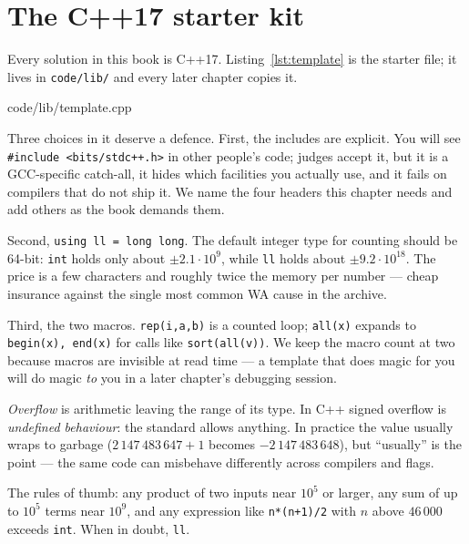 \section{The C++17 starter kit}\label{sec:starter}

Every solution in this book is C++17. Listing~\ref{lst:template} is the
starter file; it lives in \texttt{code/lib/} and every later chapter
copies it.


{code/lib/template.cpp}

Three choices in it deserve a defence. First, the includes are explicit.
You will see \texttt{\#include <bits/stdc++.h>} in other people's code; judges
accept it, but it is a GCC-specific catch-all, it hides which facilities you
actually use, and it fails on compilers that do not ship it. We name the four
headers this chapter needs and add others as the book demands them.

Second, \texttt{using ll = long long}. The default integer type for counting
should be 64-bit: \texttt{int} holds only
about $\pm 2.1\cdot 10^9$, while \texttt{ll} holds about
$\pm 9.2\cdot 10^{18}$. The price is a few characters and roughly twice the
memory per number --- cheap insurance against the single most common WA cause
in the archive.

Third, the two macros. \texttt{rep(i,a,b)} is a counted loop;
\texttt{all(x)} expands to \texttt{begin(x), end(x)} for calls like
\texttt{sort(all(v))}. We keep the macro count at two because macros are
invisible at read time --- a template that does magic for you will do magic
\emph{to} you in a later chapter's debugging session.

\begin{definition}
\emph{Overflow} is arithmetic leaving the range of its type. In C++ signed
overflow is \emph{undefined behaviour}: the standard
allows anything. In practice the value usually wraps to garbage
($2\,147\,483\,647+1$ becomes $-2\,147\,483\,648$), but ``usually'' is the
point --- the same code can misbehave differently across compilers and flags.
\end{definition}

The rules of thumb: any product of two inputs near $10^5$ or larger, any sum
of up to $10^5$ terms near $10^9$, and any expression like \texttt{n*(n+1)/2}
with $n$ above $46\,000$ exceeds \texttt{int}. When in doubt, \texttt{ll}.

